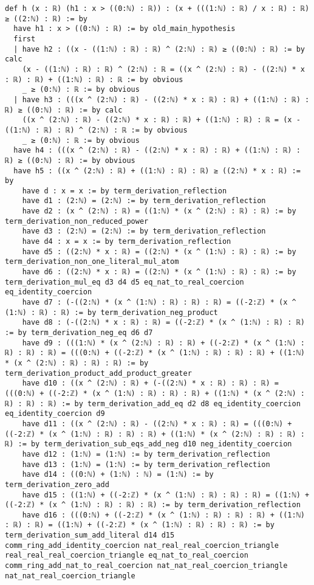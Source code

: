 \documentclass{article}
\begin{document}
\begin{tcolorbox}[colback=white!10, width=\linewidth]
\begin{lstlisting}[language=Lean4]
def h (x : ℝ) (h1 : x > ((0:ℕ) : ℝ)) : (x + (((1:ℕ) : ℝ) / x : ℝ) : ℝ) ≥ ((2:ℕ) : ℝ) := by
  have h1 : x > ((0:ℕ) : ℝ) := by old_main_hypothesis
  first
  | have h2 : ((x - ((1:ℕ) : ℝ) : ℝ) ^ (2:ℕ) : ℝ) ≥ ((0:ℕ) : ℝ) := by calc
    (x - ((1:ℕ) : ℝ) : ℝ) ^ (2:ℕ) : ℝ = ((x ^ (2:ℕ) : ℝ) - ((2:ℕ) * x : ℝ) : ℝ) + ((1:ℕ) : ℝ) : ℝ := by obvious
    _ ≥ (0:ℕ) : ℝ := by obvious
  | have h3 : (((x ^ (2:ℕ) : ℝ) - ((2:ℕ) * x : ℝ) : ℝ) + ((1:ℕ) : ℝ) : ℝ) ≥ ((0:ℕ) : ℝ) := by calc
    ((x ^ (2:ℕ) : ℝ) - ((2:ℕ) * x : ℝ) : ℝ) + ((1:ℕ) : ℝ) : ℝ = (x - ((1:ℕ) : ℝ) : ℝ) ^ (2:ℕ) : ℝ := by obvious
    _ ≥ (0:ℕ) : ℝ := by obvious
  have h4 : (((x ^ (2:ℕ) : ℝ) - ((2:ℕ) * x : ℝ) : ℝ) + ((1:ℕ) : ℝ) : ℝ) ≥ ((0:ℕ) : ℝ) := by obvious
  have h5 : ((x ^ (2:ℕ) : ℝ) + ((1:ℕ) : ℝ) : ℝ) ≥ ((2:ℕ) * x : ℝ) := by
    have d : x = x := by term_derivation_reflection
    have d1 : (2:ℕ) = (2:ℕ) := by term_derivation_reflection
    have d2 : (x ^ (2:ℕ) : ℝ) = ((1:ℕ) * (x ^ (2:ℕ) : ℝ) : ℝ) := by term_derivation_non_reduced_power
    have d3 : (2:ℕ) = (2:ℕ) := by term_derivation_reflection
    have d4 : x = x := by term_derivation_reflection
    have d5 : ((2:ℕ) * x : ℝ) = ((2:ℕ) * (x ^ (1:ℕ) : ℝ) : ℝ) := by term_derivation_non_one_literal_mul_atom
    have d6 : ((2:ℕ) * x : ℝ) = ((2:ℕ) * (x ^ (1:ℕ) : ℝ) : ℝ) := by term_derivation_mul_eq d3 d4 d5 eq_nat_to_real_coercion eq_identity_coercion
    have d7 : (-((2:ℕ) * (x ^ (1:ℕ) : ℝ) : ℝ) : ℝ) = ((-2:ℤ) * (x ^ (1:ℕ) : ℝ) : ℝ) := by term_derivation_neg_product
    have d8 : (-((2:ℕ) * x : ℝ) : ℝ) = ((-2:ℤ) * (x ^ (1:ℕ) : ℝ) : ℝ) := by term_derivation_neg_eq d6 d7
    have d9 : (((1:ℕ) * (x ^ (2:ℕ) : ℝ) : ℝ) + ((-2:ℤ) * (x ^ (1:ℕ) : ℝ) : ℝ) : ℝ) = (((0:ℕ) + ((-2:ℤ) * (x ^ (1:ℕ) : ℝ) : ℝ) : ℝ) + ((1:ℕ) * (x ^ (2:ℕ) : ℝ) : ℝ) : ℝ) := by term_derivation_product_add_product_greater
    have d10 : ((x ^ (2:ℕ) : ℝ) + (-((2:ℕ) * x : ℝ) : ℝ) : ℝ) = (((0:ℕ) + ((-2:ℤ) * (x ^ (1:ℕ) : ℝ) : ℝ) : ℝ) + ((1:ℕ) * (x ^ (2:ℕ) : ℝ) : ℝ) : ℝ) := by term_derivation_add_eq d2 d8 eq_identity_coercion eq_identity_coercion d9
    have d11 : ((x ^ (2:ℕ) : ℝ) - ((2:ℕ) * x : ℝ) : ℝ) = (((0:ℕ) + ((-2:ℤ) * (x ^ (1:ℕ) : ℝ) : ℝ) : ℝ) + ((1:ℕ) * (x ^ (2:ℕ) : ℝ) : ℝ) : ℝ) := by term_derivation_sub_eqs_add_neg d10 neg_identity_coercion
    have d12 : (1:ℕ) = (1:ℕ) := by term_derivation_reflection
    have d13 : (1:ℕ) = (1:ℕ) := by term_derivation_reflection
    have d14 : ((0:ℕ) + (1:ℕ) : ℕ) = (1:ℕ) := by term_derivation_zero_add
    have d15 : ((1:ℕ) + ((-2:ℤ) * (x ^ (1:ℕ) : ℝ) : ℝ) : ℝ) = ((1:ℕ) + ((-2:ℤ) * (x ^ (1:ℕ) : ℝ) : ℝ) : ℝ) := by term_derivation_reflection
    have d16 : (((0:ℕ) + ((-2:ℤ) * (x ^ (1:ℕ) : ℝ) : ℝ) : ℝ) + ((1:ℕ) : ℝ) : ℝ) = ((1:ℕ) + ((-2:ℤ) * (x ^ (1:ℕ) : ℝ) : ℝ) : ℝ) := by term_derivation_sum_add_literal d14 d15 comm_ring_add_identity_coercion nat_real_real_coercion_triangle real_real_real_coercion_triangle eq_nat_to_real_coercion comm_ring_add_nat_to_real_coercion nat_nat_real_coercion_triangle nat_nat_real_coercion_triangle

\end{lstlisting}
\end{tcolorbox}
\end{document}
